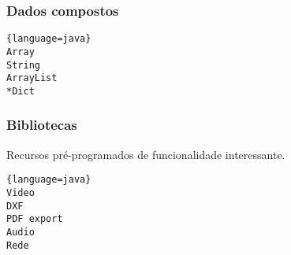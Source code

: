 \documentclass{beamer}
\begin{document}
\begin{frame}[fragile]
\frametitle{Dados compostos}
\begin{lstlisting}{language=java}
Array
String
ArrayList
*Dict 
\end{lstlisting}
\end{frame}



\begin{frame}[fragile]
\frametitle{Bibliotecas}
Recursos pré-programados de funcionalidade interessante.
\begin{lstlisting}{language=java}
Video
DXF 
PDF export
Audio
Rede
\end{lstlisting}
\end{frame}











% 
%  
% 
% 
%  
% 
\end{document}
